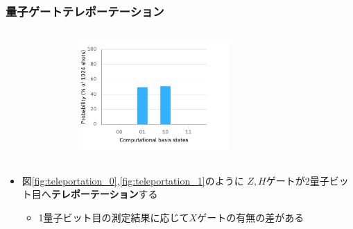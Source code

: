 \begin{frame}
  \frametitle{量子ゲートテレポーテーション}

  \begin{columns}
    \begin{column}{0.6\textwidth}
      \begin{figure}
        \centering
      \end{figure}
    \end{column}
    \begin{column}{0.4\textwidth}
      \begin{figure}
        \includegraphics[width=0.6\textwidth]{./img/cz_teleportation_histogram.pdf}
      \end{figure}
    \end{column}
  \end{columns}

  \begin{itemize}
    \item 図\ref{fig:teleportation_0},\ref{fig:teleportation_1}のように
    $Z,H$ゲートが2量子ビット目へ\textbf{テレポーテーション}する
    \begin{itemize}
      \item 1量子ビット目の測定結果に応じて$X$ゲートの有無の差がある
    \end{itemize}
  \end{itemize}


\end{frame}
